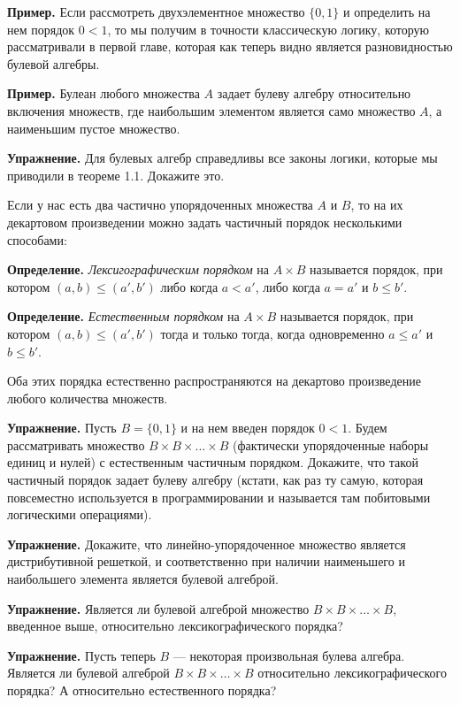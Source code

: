 {\bfseries Пример.} Если рассмотреть двухэлементное множество $\{0, 1\}$ и определить на нем порядок $0 < 1$, то мы получим в точности классическую логику, которую рассматривали в первой главе, которая как теперь видно является разновидностью булевой алгебры.

{\bfseries Пример.} Булеан любого множества $A$ задает булеву алгебру относительно включения множеств, где наибольшим элементом является само множество $A$, а наименьшим пустое множество.

{\bfseries Упражнение.} Для булевых алгебр справедливы все законы логики, которые мы приводили в теореме 1.1. Докажите это.

Если у нас есть два частично упорядоченных множества $A$ и $B$, то на их декартовом произведении можно задать частичный порядок несколькими способами:

{\bfseries Определение.} {\slshape Лексигографическим порядком} на $A\times B$ называется порядок, при котором $(a, b) \le (a', b')$ либо когда $a < a'$, либо когда $a=a'$ и $b\le b'$.

{\bfseries Определение.} {\slshape Естественным порядком} на $A\times B$ называется порядок, при котором $(a, b) \le (a', b')$ тогда и только тогда, когда одновременно $a \le a'$ и $b \le b'$.

Оба этих порядка естественно распространяются на декартово произведение любого количества множеств.

{\bfseries Упражнение.} Пусть $B = \{0, 1\}$ и на нем введен порядок $0 < 1$. Будем рассматривать множество $B\times B\times \ldots \times B$ (фактически упорядоченные наборы единиц и нулей) с естественным частичным порядком. Докажите, что такой частичный порядок задает булеву алгебру (кстати, как раз ту самую, которая повсеместно используется в программировании и называется там побитовыми логическими операциями).

{\bfseries Упражнение.} Докажите, что линейно-упорядоченное множество является дистрибутивной решеткой, и соответственно при наличии наименьшего и наибольшего элемента является булевой алгеброй.

{\bfseries Упражнение.} Является ли булевой алгеброй множество $B\times B \times \ldots \times B$, введенное выше, относительно лексикографического порядка?

{\bfseries Упражнение.} Пусть теперь $B$ — некоторая произвольная булева алгебра. Является ли булевой алгеброй $B\times B \times \ldots \times B$ относительно лексикографического порядка? А относительно естественного порядка?
